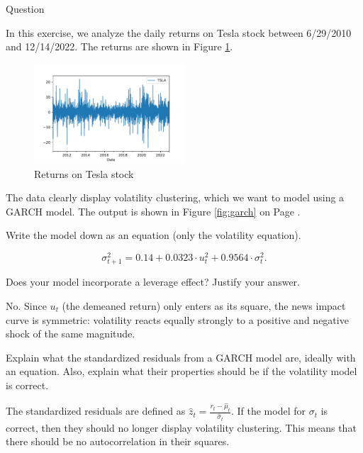 \documentclass[12pt, a4paper]{article}
\begin{document}
\newpage
{}
\begin{exam}{Question \thequestion}
\begin{instructions}
In this exercise, we analyze the daily returns on Tesla stock between 6/29/2010 and 12/14/2022. The returns are shown in Figure \ref{fig:returns}.
\begin{figure}[H]
\begin{center}
\includegraphics[width=0.5\textwidth]{tsla}
\end{center}
\caption{Returns on Tesla stock}\label{fig:returns}
\end{figure}
The data clearly display volatility clustering, which we want to model using a GARCH model. The output is shown in Figure \ref{fig:garch} on Page \pageref{fig:garch}.
\end{instructions}
\begin{problem}[3]
Write the model down as an equation (only the volatility equation).
\begin{solution}[4cm]
\[
\sigma^2_{t+1} = 0.14 + 0.0323 \cdot  u_t^2 + 0.9564 \cdot \sigma_t^2.
\]
\end{solution}
\end{problem}
\begin{problem}[6]
Does your model incorporate a leverage effect? Justify your answer.
\begin{solution}[7cm]
No. Since $u_t$ (the demeaned return) only enters as its square, the news impact curve is symmetric: volatility reacts equally strongly to a positive and negative shock of the same magnitude.
\end{solution}
\end{problem}
\begin{problem}[6]
Explain what the standardized residuals from a GARCH model are, ideally with an equation. Also, explain what their properties should be if the volatility model is correct.
\begin{solution}[10cm]
The standardized residuals are defined as $\hat{z}_t=\frac{r_t-\hat{\mu}_t}{\hat{\sigma}_t}$. If the model for $\sigma_t$ is correct, then they should no longer display volatility clustering. This means that there should be no autocorrelation in their squares.

\end{solution}
\end{problem}
\end{exam}
\end{document}
